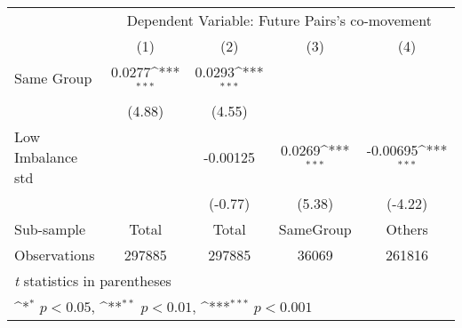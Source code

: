 {
\def\sym#1{\ifmmode^{#1}\else\(^{#1}\)\fi}
\begin{tabular}{l*{4}{c}}
\hline\hline
                &\multicolumn{4}{c}{Dependent Variable:  Future Pairs's co-movement}        \\\cmidrule(lr){2-5}
                &\multicolumn{1}{c}{(1)}         &\multicolumn{1}{c}{(2)}         &\multicolumn{1}{c}{(3)}         &\multicolumn{1}{c}{(4)}         \\
\hline
Same Group      &   0.0277\sym{***}&   0.0293\sym{***}&                  &                  \\
                &   (4.88)         &   (4.55)         &                  &                  \\
[1em]
Low Imbalance std&                  & -0.00125         &   0.0269\sym{***}& -0.00695\sym{***}\\
                &                  &  (-0.77)         &   (5.38)         &  (-4.22)         \\
\hline
Sub-sample      &    Total         &    Total         &SameGroup         &   Others         \\
Observations    &   297885         &   297885         &    36069         &   261816         \\
\hline\hline
\multicolumn{5}{l}{\footnotesize \textit{t} statistics in parentheses}\\
\multicolumn{5}{l}{\footnotesize \sym{*} \(p<0.05\), \sym{**} \(p<0.01\), \sym{***} \(p<0.001\)}\\
\end{tabular}
}
